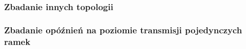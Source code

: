 \subsubsection{Zbadanie innych topologii}

\subsubsection{Zbadanie opóźnień na poziomie transmisji pojedynczych ramek}
%
%
%
%
